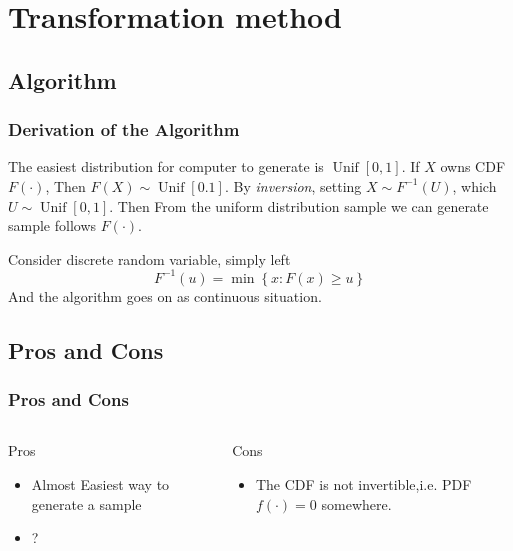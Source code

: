 \section{Transformation method}
\subsection{Algorithm}

\begin{frame}
    \frametitle{Derivation of the Algorithm}

    The easiest distribution for computer to generate is \(\operatorname{Unif}[0,1]\). If \(X\) owns CDF \(F(\cdot)\), Then \(F(X) \sim \operatorname{Unif}[0.1]\). By \textit{inversion}, setting \(X \sim F^{-1}(U)\), which \(U \sim \operatorname{Unif}[0,1]\). Then From the uniform distribution sample we can generate sample follows \(F(\cdot)\).
    \vspace*{1em}

    Consider discrete random variable, simply left
    \[F^{-1} (u) = \min\left\{x:F(x)\geq u\right\}\]
    And the algorithm goes on as continuous situation.

\end{frame}
\subsection{Pros and Cons}
\begin{frame}
    \frametitle{Pros and Cons}
    \begin{columns}
        \begin{block}{Pros}
            \begin{itemize}
                \item Almost Easiest way to generate a sample
                \item ?
            \end{itemize}
        \end{block}
        
        \begin{block}{Cons}
            \begin{itemize}
                \item The CDF is not invertible,i.e. PDF \(f(\cdot) = 0\) somewhere.
            \end{itemize}
        \end{block}

        
    \end{columns}
    
\end{frame}
